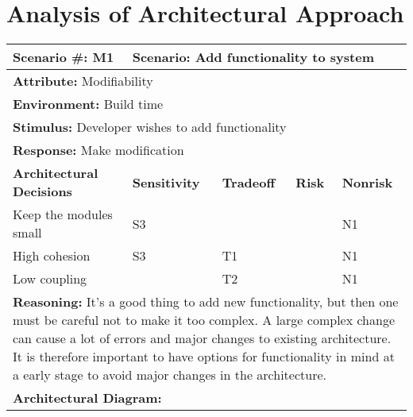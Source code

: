 \section{Analysis of Architectural Approach}

\begin{tabular}{|m{}|m{}|m{}
|m{}|m{}|m{}|}
  \hline
  {\bf Scenario \#:} M1 & \multicolumn{5}{m{0.75 \textwidth}|}{{\bf Scenario:}
  Add functionality to system} \\ \hline
  \multicolumn{6}{|m{0.9 \textwidth}|}{{\bf Attribute:} Modifiability}
  \\ \hline
  \multicolumn{6}{|m{0.9 \textwidth}|}{{\bf Environment:} Build time} \\ \hline
  \multicolumn{6}{|m{0.9 \textwidth}|}{{\bf Stimulus:} Developer wishes to add
  functionality} \\ \hline
  \multicolumn{6}{|m{0.9 \textwidth}|}{{\bf Response:} Make modification}
  \\ \hline
  \multicolumn{2}{|m{0.3 \textwidth}|}{\bf Architectural Decisions} &
  {\bf Sensitivity} & {\bf Tradeoff} & {\bf Risk} & {\bf Nonrisk} \\ \hline
  \multicolumn{2}{|m{0.3 \textwidth}|}{Keep the modules small} & S3 & & & N1
  \\ \hline
  \multicolumn{2}{|m{0.3 \textwidth}|}{High cohesion} & S3 & T1 &  & N1
  \\ \hline
  \multicolumn{2}{|m{0.3 \textwidth}|}{Low coupling} &  & T2 &  & N1 \\ \hline
  \multicolumn{6}{|m{0.9 \textwidth}|}{{\bf Reasoning:} It's a good thing to
  add new functionality, but then one must be careful not to make it too
  complex. A large complex change can cause a lot of errors and major changes
  to existing architecture. It is therefore important to have options for
  functionality in mind at a early stage to avoid major changes in the
  architecture.} \\ \hline
  \multicolumn{6}{|m{0.9 \textwidth}|}{{\bf Architectural Diagram:} } \\ \hline
\end{tabular}

